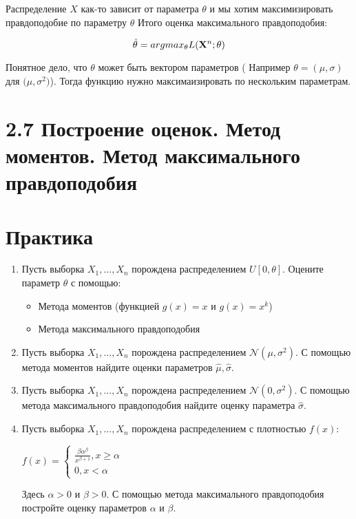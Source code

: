 \documentclass[a4paper, 14pt]{extarticle}
\begin{document}
Распределение $X$ как-то зависит от параметра $\theta$ и мы хотим максимизировать правдоподобие по параметру $\theta$
Итого оценка максимального правдоподобия:

$$\hat\theta = argmax_{\theta}L(\bold X^n; \theta)$$

Понятное дело, что $\theta$ может быть вектором параметров ( Например $\theta = (\mu, \sigma)$ для $\mathcal(\mu, \sigma^2)$). 
Тогда функцию нужно максимаизировать по нескольким параметрам. 

\newpage

\section*{2.7 Построение оценок. Метод моментов. Метод максимального правдоподобия}
\section*{Практика}
\begin{enumerate}
	\item Пусть выборка $X_1, ..., X_n$ порождена распределением $U[0, \theta]$. 
	Оцените параметр $\theta$ с помощью:
	\begin{itemize}
		\item Метода моментов (функцией $g(x) = x$ и $g(x) = x^k$)
		\item Метода максимального правдоподобия
	\end{itemize}
	
	\item Пусть выборка $X_1, ..., X_n$ порождена распределением $\mathcal{N}(\mu, \sigma^2)$. 
	С помощью метода моментов найдите оценки параметров $\hat \mu, \hat\sigma$.
	
	\item Пусть выборка $X_1, ..., X_n$ порождена распределением $\mathcal{N}(0, \sigma^2)$. 
	С помощью метода максимального правдоподобия найдите оценку параметра $\hat\sigma$.
	
	\item Пусть выборка $X_1, ..., X_n$ порождена распределением с плотностью $f(x)$:
	\begin{center}
		$f(x) = \begin{cases}
			\frac{\beta \alpha^{\beta}}{x^{\beta + 1}}, x \ge \alpha\\
			0, x < \alpha
		\end{cases}$
	\end{center}
	Здесь $\alpha > 0$ и $\beta > 0$. С помощью метода максимального правдоподобия постройте оценку параметров $\alpha$ и $\beta$.
	
	
\end{enumerate}
\newpage
\end{document}
